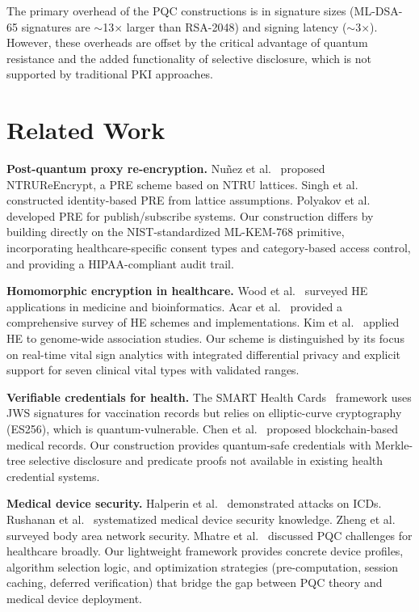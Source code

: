 \documentclass[conference,10pt]{IEEEtran}
\newcommand{\mlkem}{\textsf{ML-KEM}}
\newcommand{\mldsa}{\textsf{ML-DSA}}
\begin{document}
The primary overhead of the PQC constructions is in signature sizes (\mldsa{}-65 signatures are ${\sim}$13$\times$ larger than RSA-2048) and signing latency (${\sim}$3$\times$). However, these overheads are offset by the critical advantage of quantum resistance and the added functionality of selective disclosure, which is not supported by traditional PKI approaches.

\section{Related Work}
\label{sec:related}

\textbf{Post-quantum proxy re-encryption.} Nu{\~n}ez et al.~\cite{nuñez2015pre} proposed NTRUReEncrypt, a PRE scheme based on NTRU lattices. Singh et al.~\cite{singh2020pqpre} constructed identity-based PRE from lattice assumptions. Polyakov et al.~\cite{polyakov2017pre} developed PRE for publish/subscribe systems. Our construction differs by building directly on the NIST-standardized \mlkem{}-768 primitive, incorporating healthcare-specific consent types and category-based access control, and providing a HIPAA-compliant audit trail.

\textbf{Homomorphic encryption in healthcare.} Wood et al.~\cite{wood2020he_health} surveyed HE applications in medicine and bioinformatics. Acar et al.~\cite{acar2018survey_he} provided a comprehensive survey of HE schemes and implementations. Kim et al.~\cite{kim2018bfv_genomics} applied HE to genome-wide association studies. Our scheme is distinguished by its focus on real-time vital sign analytics with integrated differential privacy and explicit support for seven clinical vital types with validated ranges.

\textbf{Verifiable credentials for health.} The SMART Health Cards~\cite{smarthealth} framework uses JWS signatures for vaccination records but relies on elliptic-curve cryptography (ES256), which is quantum-vulnerable. Chen et al.~\cite{chen2022ehr_blockchain} proposed blockchain-based medical records. Our construction provides quantum-safe credentials with Merkle-tree selective disclosure and predicate proofs not available in existing health credential systems.

\textbf{Medical device security.} Halperin et al.~\cite{halperin2008icd} demonstrated attacks on ICDs. Rushanan et al.~\cite{rushanan2014meddev} systematized medical device security knowledge. Zheng et al.~\cite{zheng2017mediot} surveyed body area network security. Mhatre et al.~\cite{mhatre2024pqhealth} discussed PQC challenges for healthcare broadly. Our lightweight framework provides concrete device profiles, algorithm selection logic, and optimization strategies (pre-computation, session caching, deferred verification) that bridge the gap between PQC theory and medical device deployment.
\end{document}

